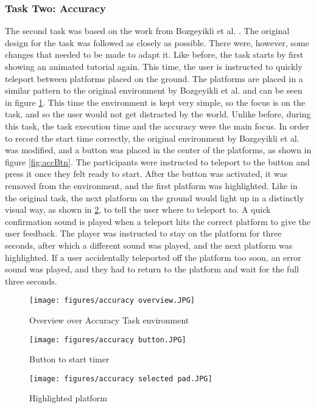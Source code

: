 \subsubsection{Task Two: Accuracy}
The second task was based on the work from Bozgeyikli et al. \cite{bozgeyikli}. The original design for the task was followed as closely as possible. There were, however, some changes that needed to be made to adapt it. Like before, the task starts by first showing an animated tutorial again. This time, the user is instructed to quickly teleport between platforms placed on the ground. The platforms are placed in a similar pattern to the original environment by Bozgeyikli et al. and can be seen in figure \ref{fig:accOver}. This time the environment is kept very simple, so the focus is on the task, and so the user would not get distracted by the world. Unlike before, during this task, the task execution time and the accuracy were the main focus. In order to record the start time correctly, the original environment by Bozgeyikli et al. was modified, and a button was placed in the center of the platforms, as shown in figure \ref{fig:accBtn}. The participants were instructed to teleport to the button and press it once they felt ready to start. After the button was activated, it was removed from the environment, and the first platform was highlighted. Like in the original task, the next platform on the ground would light up in a distinctly visual way, as shown in \ref{fig:accPad}, to tell the user where to teleport to. A quick confirmation sound is played when a teleport hits the correct platform to give the user feedback. The player was instructed to stay on the platform for three seconds, after which a different sound was played, and the next platform was highlighted. If a user accidentally teleported off the platform too soon, an error sound was played, and they had to return to the platform and wait for the full three seconds. 

\begin{figure}[!ht]
    \centering
    \texttt{[image: figures/accuracy overview.JPG]}
    \caption{Overview over Accuracy Task environment}
    \label{fig:accOver}
\end{figure}

\begin{figure}[!htb]
        \texttt{[image: figures/accuracy button.JPG]}
        \caption{Button to start timer}
        \label{fig:accBtn}
    \endminipage\hfill
        \texttt{[image: figures/accuracy selected pad.JPG]}
        \caption{Highlighted platform}
        \label{fig:accPad}
    \endminipage\hfill
\end{figure}


